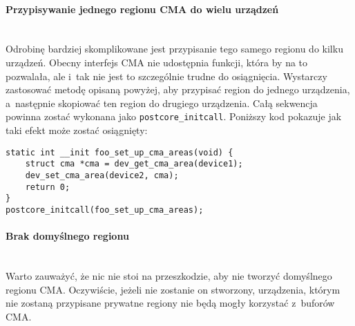 \paragraph{Przypisywanie jednego regionu CMA do wielu urządzeń} \hspace{0pt} \\

Odrobinę bardziej skomplikowane jest przypisanie tego samego regionu
do kilku urządzeń.  Obecny interfejs CMA nie udostępnia funkcji, która
by na to pozwalała, ale i~tak nie jest to szczególnie trudne do
osiągnięcia.  Wystarczy zastosować metodę opisaną powyżej, aby
przypisać region do jednego urządzenia, a~następnie skopiować ten
region do drugiego urządzenia.  Całą sekwencja powinna zostać wykonana
jako \lstinline|postcore_initcall|.  Poniższy kod pokazuje jak taki
efekt może zostać osiągnięty:

\begin{lstlisting}
static int __init foo_set_up_cma_areas(void) {
	struct cma *cma = dev_get_cma_area(device1);
	dev_set_cma_area(device2, cma);
	return 0;
}
postcore_initcall(foo_set_up_cma_areas);
\end{lstlisting}

\paragraph{Brak domyślnego regionu} \hspace{0pt} \\

Warto zauważyć, że nic nie stoi na przeszkodzie, aby nie tworzyć
domyślnego regionu CMA.  Oczywiście, jeżeli nie zostanie on stworzony,
urządzenia, którym nie zostaną przypisane prywatne regiony nie będą
mogły korzystać z~buforów CMA.
